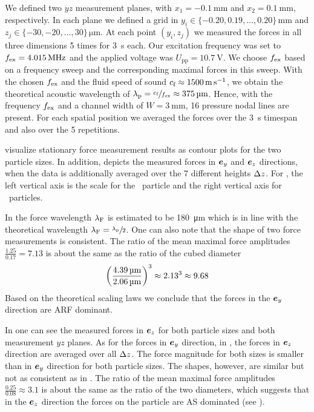 We defined two $yz$ measurement planes, with $x_{1} = \SI{-0.1}{\mm}$ and 
$x_{2} = \SI{0.1}{\mm}$, respectively. In each plane we defined a grid in 
$y_{i} \in \{-0.20,0.19,\dots,0.20\}\, \si{\mm}$ and $z_{j} \in 
\{-30,-20,\dots,30\}\,\si{\um}$. At each point $(y_{i}, z_{j})$ we measured the 
forces in all three dimensions 5 times for \SI{3}{\second} each. Our excitation 
frequency was set to $\fex = \SI{4.015}{\MHz}$ and the applied voltage was 
$U_{\text{pp}} = \SI{10.7}{\volt}$. We choose $f_{\text{ex}}$ based on a frequency sweep 
and the corresponding maximal forces in this sweep. With the chosen $f_{\text{ex}}$ and 
the fluid speed of sound $c_{\text{f}} \approx \SI{1500}{\meter\per\second}$, we obtain 
the theoretical acoustic wavelength of $\lap = \sfrac{\cfl}{\fex} \approx 
\SI{375}{\um}$. Hence, with the frequency $f_{\text{ex}}$ and a channel width of $W = 
\SI{3}{\mm}$, 16 pressure nodal lines are present. For each spatial position we 
averaged the forces over the \SI{3}{\second} timespan and also over the 5 
repetitions.

 visualize stationary force measurement results 
as contour plots for the two particle sizes. In addition, 
 depicts the measured forces in $\bm{e}_{y}$ and $\bm{e}_{z}$ 
directions, when the data is additionally averaged over the 7 different heights 
$\Delta z$. For , the left vertical axis is the scale 
for the \Dfour~particle and the right vertical axis for \Dtwo~particles.

In  the force wavelength $\lambda_{\text{F}}$ is estimated to be 
\SI{180}{\um} which is in line with the theoretical wavelength $\lambda_{\text{F}} = 
\sfrac{\lambda_{\text{p}}}{2}$. One can also note that the shape of two force measurements is 
consistent. The ratio of the mean maximal force amplitudes $\frac{1.25}{0.17} = 
7.13$ is about the same as the ratio of the cubed diameter
\begin{equation}
  {\left( \frac{\SI{4.39}{\micro\meter}}{\SI{2.06}{\micro\meter}} \right)}^{3} \approx 2.13^{3} \approx 9.68
 \label{eq:TC-ARF-AS-scaling}
\end{equation}
Based on the theoretical scaling laws we conclude that the forces in the $\bm{e}_{y}$ 
direction are ARF dominant.


In  one can see the measured forces in $\bm{e}_{z}$ for both particle 
sizes and both measurement $yz$ planes. As for the forces in $\bm{e}_{y}$ direction, 
in , the forces in $\bm{e}_{z}$ direction are averaged over all 
$\Delta z$. The force magnitude for both sizes is smaller than in $\bm{e}_{y}$ direction 
for both particle sizes. The shapes, however, are similar but not as consistent 
as in . The ratio of the mean maximal force amplitudes 
$\frac{0.25}{0.08} \approx 3.1$ is about the same as the ratio of the two 
diameters, which suggests that in the $\bm{e}_{z}$ direction the forces on the 
particle are AS dominated (see ).


